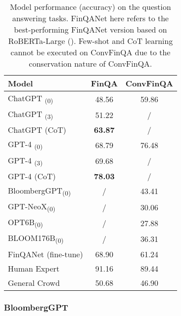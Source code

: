 \begin{table}[!h]
	\centering
	\begin{tabularx}{0.8\textwidth}{Xcc}
		\toprule
		\textbf{Model}                  & \textbf{FinQA} & \textbf{ConvFinQA} \\
		\midrule
		ChatGPT \textsubscript{(0)}     & 48.56          & 59.86              \\
		ChatGPT \textsubscript{(3)}     & 51.22          & /                  \\
		ChatGPT (CoT)                   & \textbf{63.87} & /                  \\
		GPT-4 \textsubscript{(0)}       & 68.79          & 76.48              \\
		GPT-4 \textsubscript{(3)}       & 69.68          & /                  \\
		GPT-4 (CoT)                     & \textbf{78.03} & /                  \\
		BloombergGPT\textsubscript{(0)} & /              & 43.41              \\
		GPT-NeoX\textsubscript{(0)}     & /              & 30.06              \\
		OPT6B\textsubscript{(0)}        & /              & 27.88              \\
		BLOOM176B\textsubscript{(0)}    & /              & 36.31              \\
		FinQANet (fine-tune)            & 68.90          & 61.24              \\
		Human Expert                    & 91.16          & 89.44              \\
		General Crowd                   & 50.68          & 46.90              \\
		\bottomrule
	\end{tabularx}
	\caption{Model performance (accuracy) on the question answering tasks. FinQANet here refers to the best-performing FinQANet version based on RoBERTa-Large (\textcite{chen2022afinqa}). Few-shot and CoT learning cannot be executed on ConvFinQA due to the conservation nature of ConvFinQA.}
	\label{tab:model_performance_qa}
\end{table}

\subsubsection{BloombergGPT}
\label{subsubsec:bloomberggpt}

